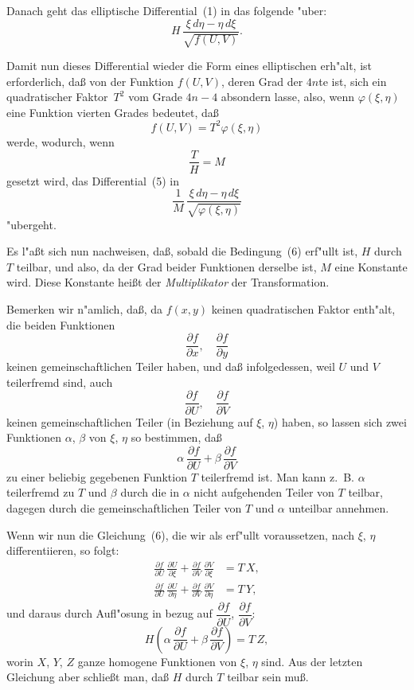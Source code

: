 \documentclass[12pt,a4paper]{article}
\theoremstyle{definition}
\begin{document}
Danach geht das elliptische Differential~(1) in das folgende "uber:
\begin{equation}\tag{5}
H\,\frac{\xi\,d\eta - \eta\,d\xi}{\sqrt{f(U,V)}}.
\end{equation}

Damit nun dieses Differential wieder die Form eines elliptischen erh"alt, ist erforderlich, da\ss{}{} von der Funktion $f(U,V)$, deren Grad der $4n$te ist, sich ein quadratischer Faktor~$T^2$ vom Grade $4n-4$ absondern lasse, also, wenn $\varphi(\xi,\eta)$ eine Funktion vierten Grades bedeutet, da\ss{}
\begin{equation}\tag{6}
f(U,V) = T^2\varphi(\xi,\eta)
\end{equation}
werde, wodurch, wenn
\begin{equation}\tag{7}
\frac{T}{H} = M
\end{equation}
gesetzt wird, das Differential~(5) in
\begin{equation}\tag{8}
\frac{1}{M}\,\frac{\xi\,d\eta - \eta\,d\xi}{\sqrt{\varphi(\xi,\eta)}}
\end{equation}
"ubergeht.

\newpage

Es l"a\ss{}t sich nun nachweisen, da\ss{}, sobald die Bedingung~(6) erf"ullt ist, $H$ durch $T$ teilbar, und also, da der Grad beider Funktionen derselbe ist, $M$ eine Konstante wird. Diese Konstante hei\ss{}t der \emph{Multiplikator} der Transformation.

Bemerken wir n"amlich, da\ss{}, da $f(x,y)$ keinen quadratischen Faktor enth"alt, die beiden Funktionen
\[\frac{\partial f}{\partial x},\quad \frac{\partial f}{\partial y}
\]
keinen gemeinschaftlichen Teiler haben, und da\ss{}{} infolgedessen, weil $U$ und $V$ teilerfremd sind, auch
\[\frac{\partial f}{\partial U},\quad \frac{\partial f}{\partial V}
\]
keinen gemeinschaftlichen Teiler (in Beziehung auf $\xi$, $\eta$) haben, so lassen sich zwei Funktionen $\alpha$, $\beta$ von $\xi$, $\eta$ so bestimmen, da\ss{}
\[\alpha\,\frac{\partial f}{\partial U} + \beta\,\frac{\partial f}{\partial V}
\]
zu einer beliebig gegebenen Funktion $T$ teilerfremd ist. Man kann z.~B. $\alpha$ teilerfremd zu $T$ und $\beta$ durch die in $\alpha$ nicht aufgehenden Teiler von $T$ teilbar, dagegen durch die gemeinschaftlichen Teiler von $T$ und $\alpha$ unteilbar annehmen.

Wenn wir nun die Gleichung~(6), die wir als erf"ullt voraussetzen, nach $\xi$, $\eta$ differentiieren, so folgt:
\begin{align*}
\frac{\partial f}{\partial U}\,\frac{\partial U}{\partial\xi} + \frac{\partial f}{\partial V}\,\frac{\partial V}{\partial\xi} &= T\,X,\\
\frac{\partial f}{\partial U}\,\frac{\partial U}{\partial\eta} + \frac{\partial f}{\partial V}\,\frac{\partial V}{\partial\eta} &= T\,Y,
\end{align*}
und daraus durch Aufl"osung in bezug auf $\dfrac{\partial f}{\partial U}$, $\dfrac{\partial f}{\partial V}$:
\[H\left(\alpha\,\frac{\partial f}{\partial U} + \beta\,\frac{\partial f}{\partial V}\right) = T\,Z,
\]
worin $X$, $Y$, $Z$ ganze homogene Funktionen von $\xi$, $\eta$ sind. Aus der letzten Gleichung aber schlie\ss{}t man, da\ss{}{} $H$ durch $T$ teilbar sein mu\ss{}.
\end{document}
